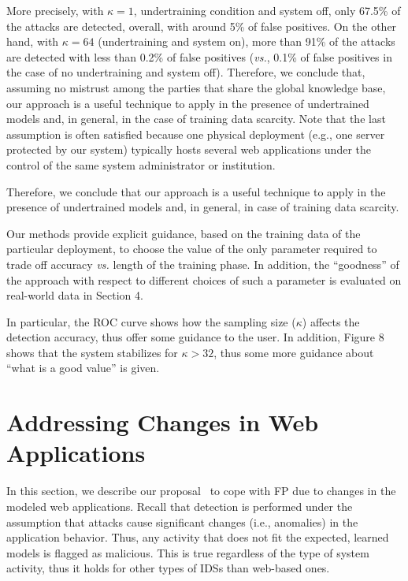 More precisely, with $\kappa = 1$, undertraining condition and system
off, only 67.5\% of the attacks are detected, overall, with around 5\%
of false positives. On the other hand, with $\kappa = 64$
(undertraining and system on), more than 91\% of the attacks are
detected with less than 0.2\% of false positives (\emph{vs.}, 0.1\% of
false positives in the case of no undertraining and system off).
Therefore, we conclude that, assuming no mistrust among the parties
that share the global knowledge base, our approach is a useful
technique to apply in the presence of undertrained models and, in
general, in the case of training data scarcity. Note that the last
assumption is often satisfied because one physical deployment (e.g.,
one server protected by our system) typically hosts several web
applications under the control of the same system administrator or
institution.

Therefore, we conclude that our approach is a useful technique to
apply in the presence of undertrained models and, in general, in case
of training data scarcity.

\begin{note}
  Our methods provide explicit guidance, based on the training data of
  the particular deployment, to choose the value of the only parameter
  required to trade off accuracy \emph{vs.} length of the training
  phase. In addition, the ``goodness'' of the approach with respect to
  different choices of such a parameter is evaluated on real-world
  data in Section 4.

  In particular, the ROC curve shows how the sampling size ($\kappa$)
  affects the detection accuracy, thus offer some guidance to the
  user. In addition, Figure 8 shows that the system stabilizes for
  $\kappa > 32$, thus some more guidance about ``what is a good
  value'' is given.
\end{note}

\section{Addressing Changes in Web Applications}
\label{web:conceptdrift}
In this section, we describe our
proposal~\citep{2009_maggi_robertson_kruegel_vigna} to cope with
\ac{FP} due to changes in the modeled web applications. Recall that
detection is performed under the assumption that attacks cause
significant changes (i.e., anomalies) in the application
behavior. Thus, any activity that does not fit the expected, learned
models is flagged as malicious. This is true regardless of the type of
system activity, thus it holds for other types of \acp{IDS}
than web-based ones.

